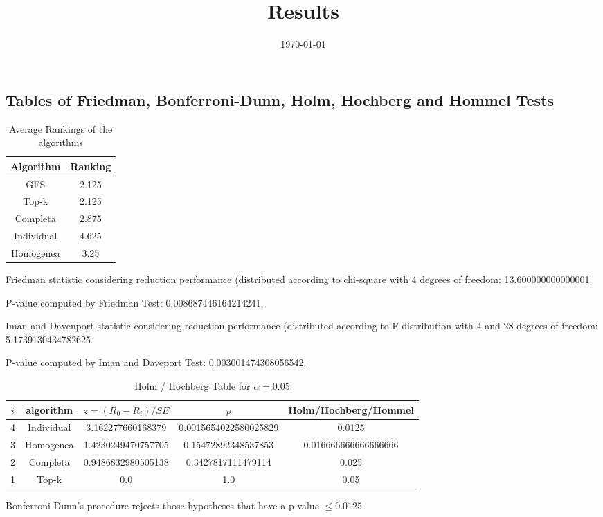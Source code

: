 \documentclass[a4paper,10pt]{article}
\title{Results}
\author{}
\date{\today}
\begin{document}
\begin{landscape}
\oddsidemargin 0in \topmargin 0in\maketitle
\section{Tables of Friedman, Bonferroni-Dunn, Holm, Hochberg and Hommel Tests}
\begin{table}[!htp]
\centering
\caption{Average Rankings of the algorithms
}\begin{tabular}{c|c}
Algorithm&Ranking\\
\hline
GFS&2.125\\
Top-k&2.125\\
Completa&2.875\\
Individual&4.625\\
Homogenea&3.25\\
\end{tabular}
\end{table}


Friedman statistic considering reduction performance (distributed according to chi-square with 4 degrees of freedom: 13.600000000000001.


P-value computed by Friedman Test: 0.008687446164214241.\newline

Iman and Davenport statistic considering reduction performance (distributed according to F-distribution with 4 and 28 degrees of freedom: 5.1739130434782625.


P-value computed by Iman and Daveport Test: 0.003001474308056542.\newline

\begin{table}[!htp]
\centering\tiny
\caption{Holm / Hochberg Table for $\alpha=0.05$}
\begin{tabular}{ccccc}
$i$&algorithm&$z=(R_0 - R_i)/SE$&$p$&Holm/Hochberg/Hommel\\
\hline
4&Individual&3.162277660168379&0.0015654022580025829&0.0125\\
3&Homogenea&1.4230249470757705&0.15472892348537853&0.016666666666666666\\
2&Completa&0.9486832980505138&0.3427817111479114&0.025\\
1&Top-k&0.0&1.0&0.05\\
\hline
\end{tabular}
\end{table}
Bonferroni-Dunn's procedure rejects those hypotheses that have a p-value $\le0.0125$.



\end{landscape}
\end{document}
